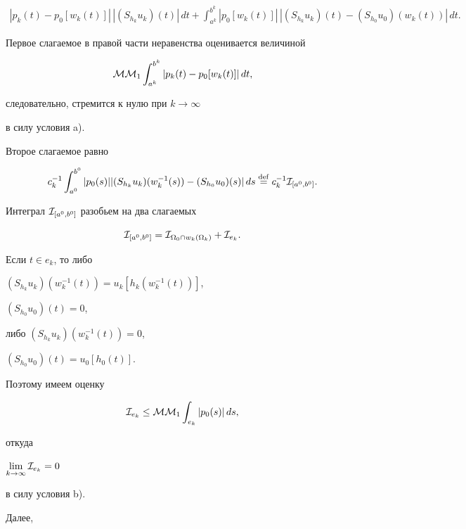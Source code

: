 \begin{pf}
\begin{multline*}
|p_k(t)  -p_0[w_k(t)]|\, |(S_{h_k}u_k)(t)|\,dt


+ \int_{a^k}^{b^k}


|p_0[w_k(t)]|\, |(S_{h_k}u_k)(t) -(S_{h_0}u_0)(w_k(t))|\,dt.


\end{multline*}


Первое слагаемое в правой части неравенства оценивается величиной


$$


{\cal M}{\cal M}_1 \int_{a^k}^{b^k}


|p_k(t) -p_0[w_k(t)] |\,dt,


$$


следовательно, стремится к нулю при $k\to\infty$


в силу условия a).





Второе слагаемое равно


$$


c^{-1}_k\int_{a^0}^{b^0}


|p_0(s)| |(S_{h_k}u_k)(w_k^{-1}(s)) - (S_{h_0}u_0)(s)|\,ds \eqdef


c^{-1}_k{\cal I}_{[a^0,b^0]}.


$$


Интеграл ${\cal I}_{[a^0,b^0]}$ разобьем на два слагаемых


$$


{\cal I}_{[a^0,b^0]} =


{\cal I}_{\Omega_0\cap w_k(\Omega_k)} + {\cal I}_{e_k}.


$$


Если $t\in e_k$, то либо


$(S_{h_k}u_k)(w_k^{-1}(t)) = u_k[h_k(w_k^{-1}(t))]$,


$(S_{h_0}u_0)(t) =0$,


либо $(S_{h_k}u_k)(w_k^{-1}(t)) = 0$,


$(S_{h_0}u_0)(t) =u_0[h_0(t)]$.


Поэтому имеем оценку


$$


{\cal I}_{e_k} \leq {\cal M}{\cal M}_1 \int_{e_k} |p_0(s)|\,ds,


$$


откуда


$\lim\limits_{k\to\infty} {\cal I}_{e_k} = 0$


в силу условия b).


Далее,


\begin{align*}



\end{align*}
\end{pf}
